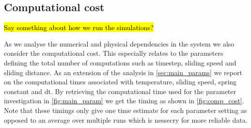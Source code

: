 \subsection{Computational cost}
\hl{Say something about how we run the simulations?}

As we analyse the numerical and physical dependencies in the system we also
consider the computational cost. This especially relates to the parameters
defining the total number of computations such as timestep, sliding speed and
sliding distance. As an extension of the analysis in \cref{sec:main_params} we
report on the computational times associated with temperature, sliding speed,
spring constant and dt. By retrieving the computational time used for the
parameter investigation in \cref{fig:main_param} we get the timing as shown in
\cref{fig:comp_cost}. Note that these timings only give one time estimate for
each parameter setting as opposed to an average over multiple runs which is
nessecry for more reliable data. 


